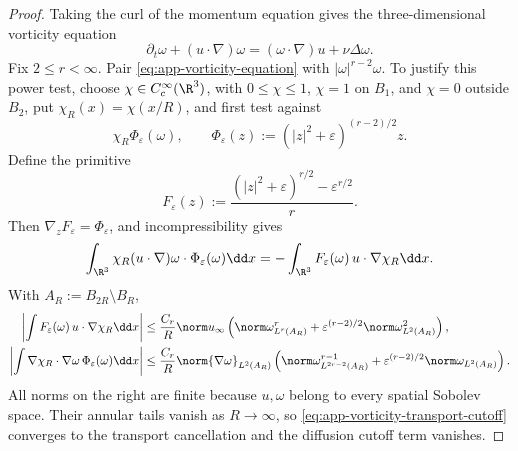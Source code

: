 \begin{proof}
Taking the curl of the momentum equation gives the three-dimensional
vorticity equation
\begin{equation}
 \partial_t\omega+(u\cdot\nabla)\omega
 = (\omega\cdot\nabla)u+\nu\Delta\omega.
 \label{eq:app-vorticity-equation}
\end{equation}
Fix \(2\le r<\infty\).  Pair
\eqref{eq:app-vorticity-equation} with
\(|\omega|^{r-2}\omega\).  To justify this power test, choose
\(\chi\in C_c^\infty(\R^3)\), with
\(0\le\chi\le1\), \(\chi=1\) on \(B_1\), and \(\chi=0\) outside
\(B_2\), put \(\chi_R(x)=\chi(x/R)\), and first test against
\[
 \chi_R\Phi_\varepsilon(\omega),
 \qquad
 \Phi_\varepsilon(z):=(|z|^2+\varepsilon)^{(r-2)/2}z.
\]
Define the primitive
\begin{equation}
 F_\varepsilon(z)
 :=\frac{(|z|^2+\varepsilon)^{r/2}-\varepsilon^{r/2}}{r}.
 \label{eq:app-vorticity-regularized-primitive}
\end{equation}
Then \(\nabla_zF_\varepsilon=\Phi_\varepsilon\), and incompressibility gives
\begin{equation}
 \int_{\R^3}\chi_R(u\cdot\nabla)\omega\cdot
 \Phi_\varepsilon(\omega)\dd x
 =-\int_{\R^3}F_\varepsilon(\omega)\,
 u\cdot\nabla\chi_R\dd x.
 \label{eq:app-vorticity-transport-cutoff}
\end{equation}
With \(A_R:=B_{2R}\setminus B_R\),
\begin{align}
 \left|\int F_\varepsilon(\omega)\,
 u\cdot\nabla\chi_R\dd x\right|
 &\le\frac{C_r}{R}\norm u_\infty
 \left(\norm\omega_{L^r(A_R)}^r
 +\varepsilon^{(r-2)/2}\norm\omega_{L^2(A_R)}^2\right),
 \label{eq:app-vorticity-transport-cutoff-bound}\\
 \left|\int \nabla\chi_R\cdot\nabla\omega\,
 \Phi_\varepsilon(\omega)\dd x\right|
 &\le\frac{C_r}{R}\norm{\nabla\omega}_{L^2(A_R)}
 \left(\norm\omega_{L^{2r-2}(A_R)}^{r-1}
 +\varepsilon^{(r-2)/2}\norm\omega_{L^2(A_R)}\right).
 \label{eq:app-vorticity-diffusion-cutoff-bound}
\end{align}
All norms on the right are finite because \(u,\omega\) belong to every
spatial Sobolev space.  Their annular tails vanish as \(R\to\infty\), so
\eqref{eq:app-vorticity-transport-cutoff} converges to the transport
cancellation and the diffusion cutoff term vanishes.


\end{proof}
